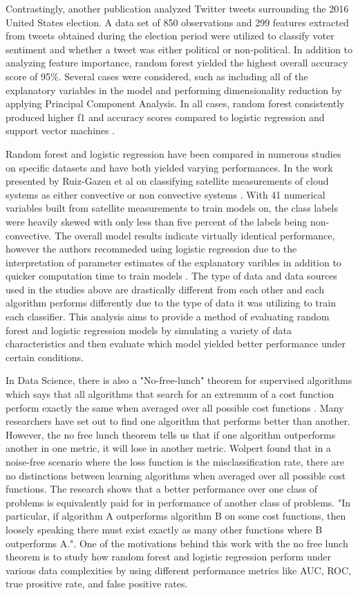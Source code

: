\documentclass{llncs}
\begin{document}
\noindent 
Contrastingly, another publication analyzed Twitter tweets surrounding the 2016 United States election. A data set of 850 observations and 299 features extracted from tweets obtained during the election period were utilized to classify voter sentiment and whether a tweet was either political or non-political. In addition to analyzing feature importance, random forest yielded the highest overall accuracy score of 95\%. Several cases were considered, such as including all of the explanatory variables in the model and performing dimensionality reduction by applying Principal Component Analysis. In all cases, random forest consistently produced higher f1 and accuracy scores compared to logistic regression and support vector machines \cite{erdem}. 

\noindent 
Random forest and logistic regression have been compared in numerous studies on specific datasets and have both yielded varying performances. In the work presented by Ruiz-Gazen et al on classifying satellite measurements of cloud systems as either convective or non convective systems \cite{ruiz}. With 41 numerical variables built from satellite measurements to train models on, the class labels were heavily skewed with only less than five percent of the labels being non-convective. The overall model results indicate virtually identical performance, however the authors recommeded using logistic regression due to the interpretation of parameter estimates of the explanatory varibles in addition to quicker computation time to train models \cite{ruiz}. The type of data and data sources used in the studies above are drastically different from each other and each algorithm performs differently due to the type of data it was utilizing to train each classifier. This analysis aims to provide a method of evaluating random forest and logistic regression models by simulating a variety of data characteristics and then evaluate which model yielded better performance under certain conditions.

\noindent 
In Data Science, there is also a "No-free-lunch" theorem for supervised algorithms which says that all algorithms that search for an extremum of a cost function perform exactly the same when averaged over all possible cost functions \cite{wolper}.  Many researchers have set out to find one algorithm that performs better than another.  However, the no free lunch theorem tells us that if one algorithm outperforms another in one metric, it will lose in another metric. Wolpert found that in a noise-free scenario where the loss function is the misclassification rate, there are no distinctions between learning algorithms when averaged over all possible cost functions.  The research shows that a better performance over one class of problems is equivalently paid for in performance of another class of problems.  "In particular, if algorithm A outperforms algorithm B on some cost functions, then loosely speaking there must exist exactly as many other functions where B outperforms A."\cite{wolper}. One of the motivations behind this work with the no free lunch theorem is to study how random forest and logistic regression perform under various data complexities by using different performance metrics like AUC, ROC, true prositive rate, and false positive rates.
\end{document}
